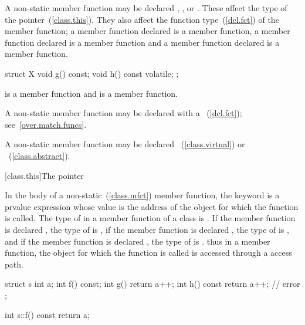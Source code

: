 \pnum
A non-static member function may be declared ,
, or  . These
 affect the type of the 
pointer~(\ref{class.this}). They also affect the function
type~(\ref{dcl.fct}) of the member function; a member function declared
 is a  member function, a member function
declared  is a  member function and a
member function declared   is a
 member function.
\enterexample

\begin{codeblock}
struct X {
  void g() const;
  void h() const volatile;
};
\end{codeblock}

 is a  member function and  is a
  member function.
\exitexample

\pnum
A non-static member function may be declared with a ~(\ref{dcl.fct}); see~\ref{over.match.funcs}.

\pnum
A non-static member function may be declared
~(\ref{class.virtual}) or ~(\ref{class.abstract}).

[class.this]{The  pointer}%

\pnum
{}%
In the body of a non-static~(\ref{class.mfct}) member function, the
keyword  is a prvalue expression whose value is the
address of the object for which the function is called.
%
The type of  in a member function of a class  is
.
%
If the member function is declared , the type of
 is  ,
%
if the member function is declared , the type of
 is  , and if the member function
is declared  , the type of  is
  .
%
\enternote thus in a  member function, the object for which the function is
called is accessed through a  access path. \exitnote
\enterexample

\begin{codeblock}
struct s {
  int a;
  int f() const;
  int g() { return a++; }
  int h() const { return a++; } // error
};

int s::f() const { return a; }
\end{codeblock}

